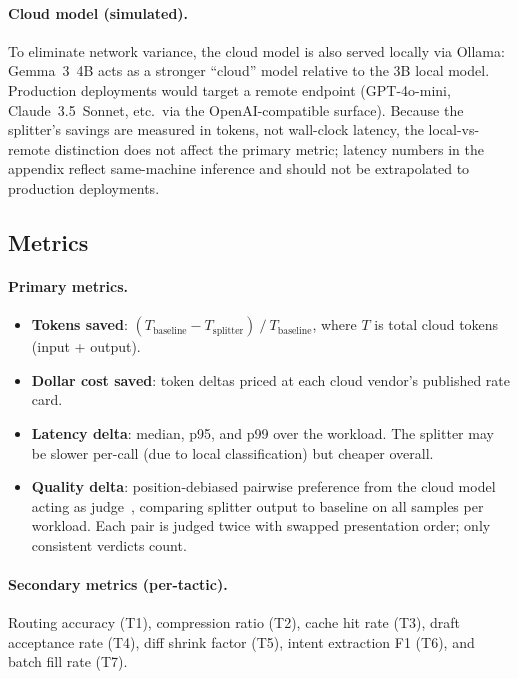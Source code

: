 \documentclass[11pt,a4paper]{article}
\begin{document}
\paragraph{Cloud model (simulated).}
To eliminate network variance, the cloud model is also served locally
via Ollama: Gemma~3~4B acts as a stronger ``cloud'' model relative to
the 3B local model. Production deployments would target a remote
endpoint (GPT-4o-mini, Claude~3.5~Sonnet, etc.\ via the
OpenAI-compatible surface). Because the splitter's savings are
measured in tokens, not wall-clock latency, the local-vs-remote
distinction does not affect the primary metric; latency numbers in
the appendix reflect same-machine inference and should not be
extrapolated to production deployments.


\subsection{Metrics}
\label{sec:metrics}

\paragraph{Primary metrics.}
\begin{itemize}
  \item \textbf{Tokens saved}: $(T_{\text{baseline}} -
    T_{\text{splitter}}) \mathbin{/} T_{\text{baseline}}$, where $T$
    is total cloud tokens (input + output).
  \item \textbf{Dollar cost saved}: token deltas priced at each cloud
    vendor's published rate card.
  \item \textbf{Latency delta}: median, p95, and p99 over the workload.
    The splitter may be slower per-call (due to local classification)
    but cheaper overall.
  \item \textbf{Quality delta}: position-debiased pairwise preference
    from the cloud model acting as judge~\cite{zheng2023judging},
    comparing splitter output to baseline on all samples per workload.
    Each pair is judged twice with swapped presentation order; only
    consistent verdicts count.
\end{itemize}

\paragraph{Secondary metrics (per-tactic).}
Routing accuracy (T1), compression ratio (T2), cache hit rate (T3),
draft acceptance rate (T4), diff shrink factor (T5), intent extraction
F1 (T6), and batch fill rate (T7).
\end{document}

